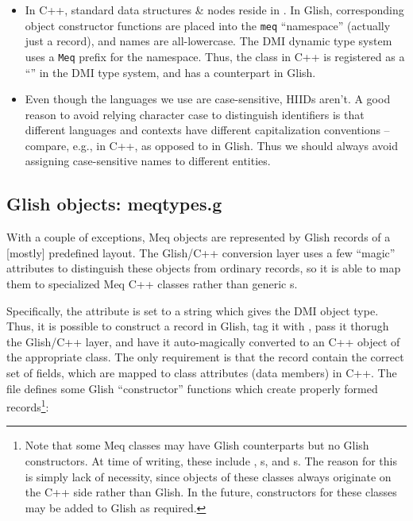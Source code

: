 \documentclass[10pt,twoside]{book}
\begin{document}
  \begin{itemize}

  \item In C++, standard data structures \& nodes reside in .
    In Glish, corresponding object constructor functions are placed into the
    {\tt meq} ``namespace'' (actually just a record), and names are
    all-lowercase. The DMI dynamic type system uses a {\tt Meq} prefix for the
    namespace. Thus, the  class in C++ is registered as a
    ``'' in the DMI type system, and  has a 
    counterpart in Glish.

  \item Even though the languages we use are case-sensitive, HIIDs aren't. A
    good reason to avoid relying character case to distinguish identifiers is
    that different languages and contexts have different capitalization
    conventions -- compare, e.g.,  in C++, as opposed to
     in Glish. Thus we should always avoid assigning
    case-sensitive names to different entities.

  \end{itemize}

\subsection{Glish  objects: meqtypes.g}

  With a couple of exceptions, Meq objects are represented by Glish records of
  a [mostly] predefined layout. The Glish/C++ conversion layer uses a few
  ``magic'' attributes to distinguish these objects from ordinary records, so
  it is able to map them to specialized Meq C++ classes rather than generic
  s. 

  Specifically, the  attribute is set to a string which
  gives the DMI object type. Thus, it is possible to construct a record in
  Glish, tag it with , pass it thorugh the Glish/C++
  layer, and have it auto-magically converted to an C++ object of the
  appropriate class. The only requirement is that the record contain the
  correct set of fields, which are mapped to class attributes (data members) in
  C++. The file  defines  some Glish ``constructor''
  functions which create properly formed records\footnote{Note that some Meq
  classes may have Glish counterparts but no Glish constructors. At time of
  writing, these include \Vells, \VellSet{}s, and \Result{}s. The reason for
  this is simply lack of necessity, since objects of these classes always
  originate on the C++ side rather than Glish. In the future, constructors for
  these classes may be added to Glish as required.}:
\end{document}
